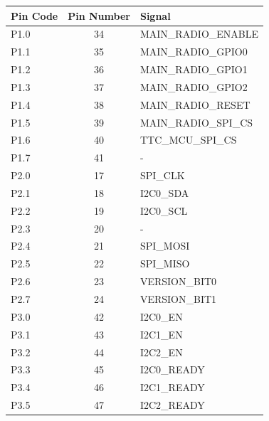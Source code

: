 \begin{longtable}{lcL{10cm}}
    \toprule[1.5pt]
    \textbf{Pin Code} & \textbf{Pin Number} & \textbf{Signal}       \\
    \midrule
    P1.0              & 34                  & MAIN\_RADIO\_ENABLE   \\
    P1.1              & 35                  & MAIN\_RADIO\_GPIO0    \\
    P1.2              & 36                  & MAIN\_RADIO\_GPIO1    \\
    P1.3              & 37                  & MAIN\_RADIO\_GPIO2    \\
    P1.4              & 38                  & MAIN\_RADIO\_RESET    \\
    P1.5              & 39                  & MAIN\_RADIO\_SPI\_CS  \\
    P1.6              & 40                  & TTC\_MCU\_SPI\_CS     \\
    P1.7              & 41                  & -                     \\
    \midrule
    P2.0              & 17                  & SPI\_CLK              \\
    P2.1              & 18                  & I2C0\_SDA             \\
    P2.2              & 19                  & I2C0\_SCL             \\
    P2.3              & 20                  & -                     \\
    P2.4              & 21                  & SPI\_MOSI             \\
    P2.5              & 22                  & SPI\_MISO             \\
    P2.6              & 23                  & VERSION\_BIT0         \\
    P2.7              & 24                  & VERSION\_BIT1         \\
    \midrule
    P3.0              & 42                  & I2C0\_EN              \\
    P3.1              & 43                  & I2C1\_EN              \\
    P3.2              & 44                  & I2C2\_EN              \\
    P3.3              & 45                  & I2C0\_READY           \\
    P3.4              & 46                  & I2C1\_READY           \\
    P3.5              & 47                  & I2C2\_READY           \\

\end{longtable}
